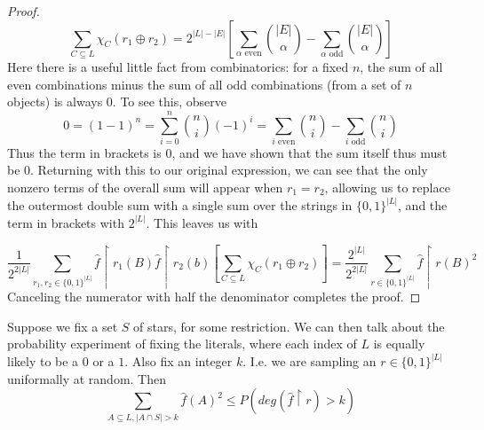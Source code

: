 \begin{proof}
\[ \sum_{C \subseteq L} \chi_C(r_1 \oplus r_2) = 2^{|L|-|E|}\left[ \sum_{\alpha \textrm{ even}} {|E| \choose \alpha} - \sum_{\alpha \textrm{ odd}} {|E| \choose \alpha} \right] \]
Here there is a useful little fact from combinatorics: for a fixed $n$, the sum of all even combinations minus the sum of all odd combinations (from a set of $n$ objects) is always $0$. To see this, observe
\[ 0 = (1-1)^n = \sum_{i=0}^n {n \choose i} (-1)^i = \sum_{i \textrm{ even}} {n \choose i} - \sum_{i \textrm{ odd}} {n \choose i} \]
Thus the term in brackets is $0$, and we have shown that the sum itself thus must be $0$. Returning with this to our original expression, we can see that the only nonzero terms of the overall sum will appear when $r_1 = r_2$, allowing us to replace the outermost double sum with a single sum over the strings in $\{0,1\}^{|L|}$, and the term in brackets with $2^{|L|}$. This leaves us with

 \[	\frac{1}{2^{2|L|}} \sum_{r_1,r_2 \in \{0,1\}^{|L|}} \hat{f}\restriction r_1(B) \hat{f}\restriction r_2(b) \left[ \sum_{C \subseteq L} \chi_C(r_1 \oplus r_2) \right] = \frac{2^{|L|}}{2^{2|L|}} \sum_{r \in \{0,1\}^{|L|}} \hat{f}\restriction r (B)^2  \]
Canceling the numerator with half the denominator completes the proof.
\end{proof}
\begin{lemma}
	Suppose we fix a set $S$ of stars, for some restriction. We can then talk about the probability experiment of fixing the literals, where each index of $L$ is equally likely to be a $0$ or a $1$. Also fix an integer $k$. I.e. we are sampling an $r \in \{0,1\}^{|L|}$ uniformally at random. Then
	\[ \sum_{A \subseteq L, |A \cap S| > k} \hat{f}(A)^2 \leq P(deg(\hat{f} \restriction r) > k) \]
\end{lemma}

